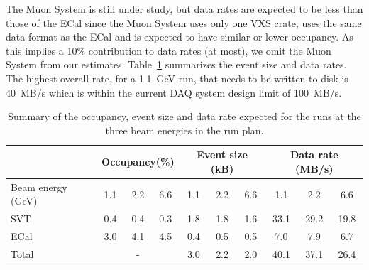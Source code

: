 The Muon System is still under study, but data rates are expected to be less than those of the ECal since the Muon System uses only one VXS crate, uses the same data format as the ECal and is expected to have similar or lower occupancy. 
As this implies a 10\% contribution to data rates (at most), we omit the Muon System from our estimates.
Table~\ref{tab:data_rates} summarizes the event size and data rates. The highest overall rate, for a 1.1~GeV run, that needs to be written to disk is 40~MB/s which is within the current 
DAQ system design limit of 100~MB/s. 
\begin{table}[]
\centering
\begin{tabular}{|l|ccc|ccc|ccc|}
\hline
 & \multicolumn{3}{|c|}{Occupancy(\%)} &  \multicolumn{3}{|c|}{Event size (kB)} &  \multicolumn{3}{|c|}{Data rate (MB/s)} \\
\hline
Beam energy (GeV) & 1.1 & 2.2 & 6.6 & 1.1 & 2.2 & 6.6 & 1.1 & 2.2 & 6.6 \\
\hline
SVT & 0.4 & 0.4  & 0.3  & 1.8 & 1.8 & 1.6 & 33.1 & 29.2 & 19.8\\
ECal & 3.0 & 4.1  & 4.5 & 0.4 & 0.5  & 0.5 & 7.0 & 7.9  & 6.7 \\
\hline
Total& \multicolumn{3}{|c|}{-} & 3.0 & 2.2 & 2.0 & 40.1 & 37.1 & 26.4 \\
\hline
\end{tabular}
\caption{{\small Summary of the occupancy, event size and data rate expected for the runs at the three beam 
energies in the run plan. }}
\label{tab:data_rates}
\end{table}
